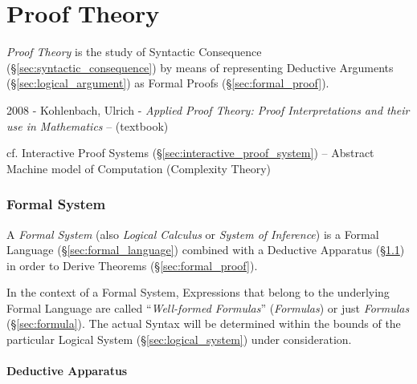 \part{Proof Theory}\label{sec:proof_theory}

\emph{Proof Theory} is the study of Syntactic Consequence
(\S\ref{sec:syntactic_consequence}) by means of representing Deductive Arguments
(\S\ref{sec:logical_argument}) as Formal Proofs (\S\ref{sec:formal_proof}).

2008 - Kohlenbach, Ulrich - \emph{Applied Proof Theory: Proof Interpretations
  and their use in Mathematics} -- (textbook)

cf. Interactive Proof Systems (\S\ref{sec:interactive_proof_system}) -- Abstract
Machine model of Computation (Complexity Theory)



\section{Formal System}\label{sec:formal_system}

A \emph{Formal System} (also \emph{Logical Calculus} or \emph{System of
  Inference}) is a Formal Language (\S\ref{sec:formal_language}) combined with a
Deductive Apparatus (\S\ref{sec:deductive_apparatus}) in order to Derive
Theorems (\S\ref{sec:formal_proof}).

In the context of a Formal System, Expressions that belong to the underlying
Formal Language are called ``\emph{Well-formed Formulas}'' (\emph{Formulas}) or
just \emph{Formulas} (\S\ref{sec:formula}). The actual Syntax will be determined
within the bounds of the particular Logical System (\S\ref{sec:logical_system})
under consideration.



\subsection{Deductive Apparatus}\label{sec:deductive_apparatus}

